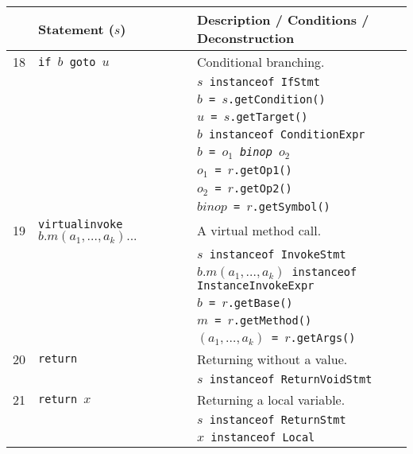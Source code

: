 \documentclass{article}
\begin{document}
\begin{scriptsize}
\begin{tabular}{lll}
\hline
& \textbf{Statement} ($s$)      & \textbf{Description / Conditions / Deconstruction}\\
\hline
\hline
18 & \texttt{if $b$ goto $u$} & Conditional branching.\\
&                & \texttt{$s$ instanceof IfStmt}\\
&                & \texttt{$b$ = $s$.getCondition()}\\
&                & \texttt{$u$ = $s$.getTarget()}\\
&                & \texttt{$b$ instanceof ConditionExpr}\\
&                & \texttt{$b$ = $o_1$ \textit{binop} $o_2$}\\
&                & \texttt{$o_1$ = $r$.getOp1()}\\
&                & \texttt{$o_2$ = $r$.getOp2()}\\
&                & \texttt{$\textit{binop}$ = $r$.getSymbol()}\\
\hline
19 & \texttt{virtualinvoke $b.m(a_1,\ldots,a_k)...$}              & A virtual method call.\\
&                & \texttt{$s$ instanceof InvokeStmt}\\
&                & \texttt{$b.m(a_1,\ldots,a_k)$ instanceof InstanceInvokeExpr}\\
&                & \texttt{$b$ = $r$.getBase()}\\
&                & \texttt{$m$ = $r$.getMethod()}\\
&                & \texttt{$(a_1,\ldots,a_k)$ = $r$.getArgs()}\\
\hline
20 & \texttt{return} & Returning without a value.\\
&                & \texttt{$s$ instanceof ReturnVoidStmt}\\
\hline
21 & \texttt{return $x$} & Returning a local variable.\\
&                & \texttt{$s$ instanceof ReturnStmt}\\
&                & \texttt{$x$ instanceof Local}\\

\end{tabular}
\end{scriptsize}
\end{document}
